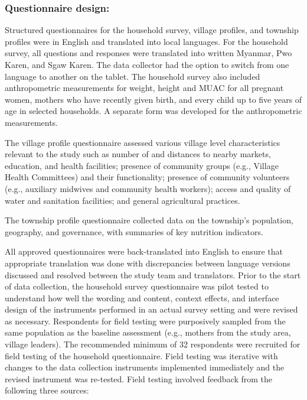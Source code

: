 \documentclass[12pt,a4paper]{article}
\begin{document}
\hypertarget{questionnaire-design}{%
\subsubsection{Questionnaire design:}\label{questionnaire-design}}

Structured questionnaires for the household survey, village profiles, and township profiles were in English and translated into local languages. For the household survey, all questions and responses were translated into written Myanmar, Pwo Karen, and Sgaw Karen. The data collector had the option to switch from one language to another on the tablet. The household survey also included anthropometric measurements for weight, height and MUAC for all pregnant women, mothers who have recently given birth, and every child up to five years of age in selected households. A separate form was developed for the anthropometric measurements.

The village profile questionnaire assessed various village level characteristics relevant to the study such as number of and distances to nearby markets, education, and health facilities; presence of community groups (e.g., Village Health Committees) and their functionality; presence of community volunteers (e.g., auxiliary midwives and community health workers); access and quality of water and sanitation facilities; and general agricultural practices.

The township profile questionnaire collected data on the township's population, geography, and governance, with summaries of key nutrition indicators.

All approved questionnaires were back-translated into English to ensure that appropriate translation was done with discrepancies between language versions discussed and resolved between the study team and translators. Prior to the start of data collection, the household survey questionnaire was pilot tested to understand how well the wording and content, context effects, and interface design of the instruments performed in an actual survey setting and were revised as necessary. Respondents for field testing were purposively sampled from the same population as the baseline assessment (e.g., mothers from the study area, village leaders). The recommended minimum of 32 respondents were recruited for field testing of the household questionnaire. Field testing was iterative with changes to the data collection instruments implemented immediately and the revised instrument was re-tested. Field testing involved feedback from the following three sources:
\end{document}
